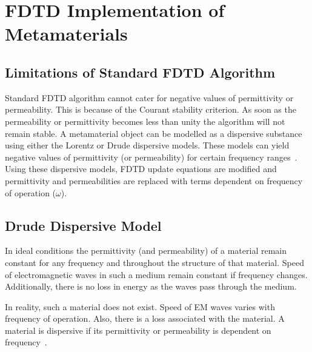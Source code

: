 \chapter{FDTD Implementation of Metamaterials}
\section{Limitations of Standard FDTD Algorithm}
Standard FDTD algorithm cannot cater for negative values of permittivity or permeability. This is because of the Courant stability criterion. As soon as the permeability or permittivity becomes less than unity the algorithm will not remain stable. A metamaterial object can be modelled as a dispersive substance using either the Lorentz or Drude dispersive models. These models can yield negative values of permittivity (or permeability) for certain frequency ranges~\cite{NumericalFDTD-Sibel}. Using these dispersive models, FDTD update equations are modified and permittivity and permeabilities are replaced with terms dependent on frequency of operation ($\omega$).
\section{Drude Dispersive Model}
In ideal conditions the permittivity (and permeability) of a material remain constant for any frequency and throughout the structure of that material. Speed of electromagnetic waves in such a medium remain constant if frequency changes. Additionally, there is no loss in energy as the waves pass through the medium.

In reality, such a material does not exist. Speed of EM waves varies with frequency of operation. Also, there is a loss associated with the material. A material is dispersive if its permittivity or permeability is dependent on frequency~\cite[Ch. 10]{JBSchneiderUFDTD}.

